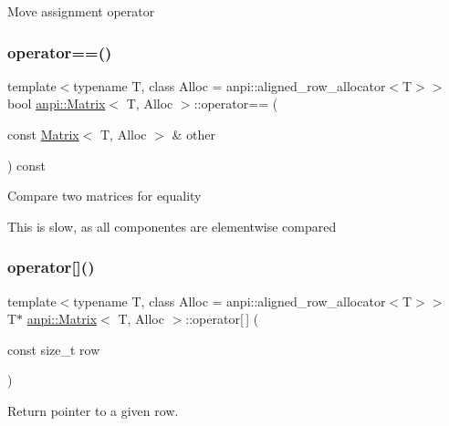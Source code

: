 Move assignment operator \mbox{\label{classanpi_1_1Matrix_aa3ea7a77b2c5e5e5b7ef95bde6981a85}} 
\subsubsection{\texorpdfstring{operator==()}{operator==()}}
{\footnotesize\ttfamily template$<$typename T, class Alloc = anpi\+::aligned\+\_\+row\+\_\+allocator$<$\+T$>$$>$ \\
bool \hyperlink{classanpi_1_1Matrix}{anpi\+::\+Matrix}$<$ T, Alloc $>$\+::operator== (\begin{DoxyParamCaption}\item[{const \hyperlink{classanpi_1_1Matrix}{Matrix}$<$ T, Alloc $>$ \&}]{other }\end{DoxyParamCaption}) const}

Compare two matrices for equality

This is slow, as all componentes are elementwise compared \mbox{\label{classanpi_1_1Matrix_a26b55be70c6d8719bf59b2ca32f6c8b4}} 
\subsubsection{\texorpdfstring{operator[]()}{operator[]()}\hspace{0.1cm}{\footnotesize\ttfamily [1/2]}}
{\footnotesize\ttfamily template$<$typename T, class Alloc = anpi\+::aligned\+\_\+row\+\_\+allocator$<$\+T$>$$>$ \\
T$\ast$ \hyperlink{classanpi_1_1Matrix}{anpi\+::\+Matrix}$<$ T, Alloc $>$\+::operator\mbox{[}$\,$\mbox{]} (\begin{DoxyParamCaption}\item[{const size\+\_\+t}]{row }\end{DoxyParamCaption})\hspace{0.3cm}{\ttfamily [inline]}}



Return pointer to a given row. 

\mbox{\label{classanpi_1_1Matrix_a1795fbe980e38936d36065831ef3d3a6}} 
